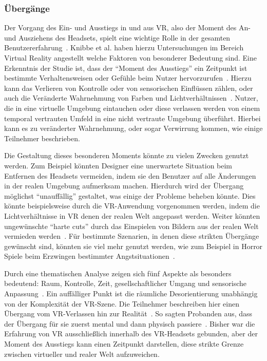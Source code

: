 \subsubsection{Übergänge}

Der Vorgang des Ein- und Ausstiegs in und aus VR, also der Moment des An- und Ausziehens des Headsets, spielt eine wichtige Rolle in der gesamten Benutzererfahrung~\cite{knibbe2018dream}.  Knibbe et al. haben hierzu Untersuchungen im Bereich Virtual Reality angestellt welche Faktoren von besonderer Bedeutung sind.
Eine Erkenntnis der Studie ist, dass der "`Moment des Ausstiegs"' ein Zeitpunkt ist bestimmte Verhaltensweisen oder Gefühle beim Nutzer hervorzurufen~\cite{knibbe2018dream}. Hierzu kann das Verlieren von Kontrolle oder von sensorischen Einflüssen zählen, oder auch die Veränderte Wahrnehmung von Farben und Lichtverhältnissen~\cite{bowman2007virtual,knibbe2018dream}. Nutzer, die in eine virtuelle Umgebung eintauchen oder diese verlassen werden von einem temporal vertrauten Umfeld in eine nicht vertraute Umgebung überführt. Hierbei kann es zu veränderter Wahrnehmung, oder sogar Verwirrung kommen, wie einige Teilnehmer beschrieben. 

Die Gestaltung dieses besonderen Moments könnte zu vielen Zwecken genutzt werden. Zum Beispiel könnten Designer eine unerwartete Situation beim Entfernen des Headsets vermeiden, indem sie den Benutzer auf alle Änderungen in der realen Umgebung aufmerksam machen.
Hierdurch wird der Übergang möglichst "`unauffällig"' gestaltet, was einige der Probleme beheben könnte. 
Dies könnte beispielsweise durch die VR-Anwendung vorgenommen werden, indem die Lichtverhältnisse in VR denen der realen Welt angepasst werden.
Weiter könnten ungewünschte "`harte cuts"' durch das Einspielen von Bildern aus der realen Welt vermieden werden~\cite{knibbe2018dream}.
Für bestimmte Szenarien, in denen diese strikten Übergänge gewünscht sind, könnten sie viel mehr genutzt werden, wie zum Beispiel in Horror Spiele beim Erzwingen bestimmter Angstsituationen~\cite{knibbe2018dream}.

Durch eine thematischen Analyse zeigen sich fünf Aspekte als besonders bedeutend: Raum, Kontrolle, Zeit, gesellschaftlicher Umgang und sensorische Anpassung~\cite{knibbe2018dream}.
Ein auffälliger Punkt ist die räumliche Desorientierung unabhängig von der Komplexität der VR-Szene. Die Teilnehmer beschreiben hier einen Übergang vom VR-Verlassen hin zur Realität~\cite{knibbe2018dream}. So sagten Probanden aus, dass der Übergang für sie zuerst mental und dann physisch passiere~\cite{knibbe2018dream}.
Bisher war die Erfahrung von VR ausschließlich innerhalb des VR-Headsets gebunden, aber der Moment des Ausstiegs kann einen Zeitpunkt darstellen, diese strikte Grenze zwischen virtueller und realer Welt aufzuweichen.

